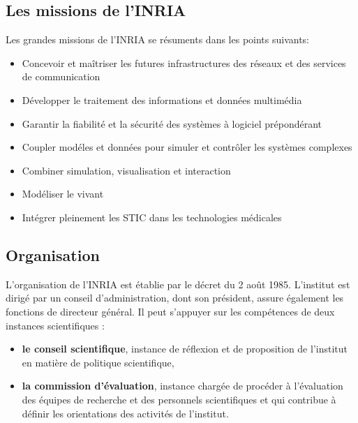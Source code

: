 \documentclass[a4paper, 11pt]{report}
\begin{document}
    \subsection{Les missions de l'INRIA}
    Les grandes missions de l'INRIA se résuments dans les points suivants:
    \begin{itemize}
     \item Concevoir et maîtriser les futures infrastructures des réseaux et
     des services de communication
     \item Développer le traitement des informations et données multimédia
     \item Garantir la fiabilité et la sécurité des systèmes à logiciel
     prépondérant
     \item Coupler modéles et données pour simuler et contrôler les systèmes
     complexes
     \item Combiner simulation, visualisation et interaction
     \item Modéliser le vivant
     \item Intégrer pleinement les STIC dans les technologies médicales
    \end{itemize}
    \subsection{Organisation}
    L'organisation de l'INRIA est établie par le décret du 2 août 1985.
    L'institut est dirigé par un conseil d'administration, dont son
    président, assure également les fonctions de directeur général.
    Il peut s'appuyer sur les compétences de deux instances scientifiques :
    \begin{itemize}
      \item \textbf{le conseil scientifique}, instance de réflexion et de
      proposition de l'institut en matière de politique scientifique,
      \item \textbf{la commission d’évaluation}, instance chargée de procéder à
      l'évaluation des équipes de recherche et des personnels scientifiques
      et qui contribue à définir les orientations des activités de l'institut.
    \end{itemize}
\end{document}
